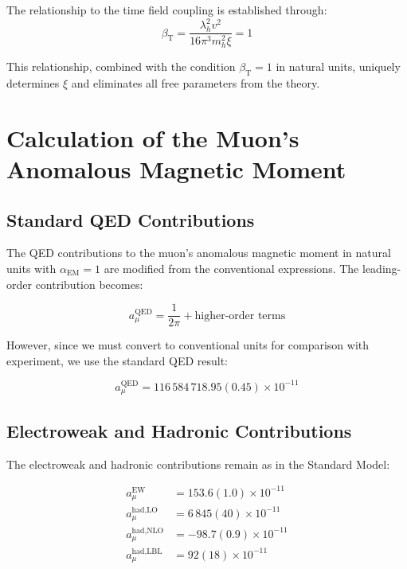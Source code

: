 \documentclass[12pt,a4paper]{article}
\newcommand{\alphaEM}{\alpha_{\text{EM}}}
\newcommand{\betaT}{\beta_{\text{T}}}
\newcommand{\xipar}{\xi}
\begin{document}
	The relationship to the time field coupling is established through:
	\begin{equation}
		\betaT = \frac{\lambda_h^2 v^2}{16\pi^3 m_h^2 \xipar} = 1
		\label{eq:beta_t_relationship}
	\end{equation}
	
	This relationship, combined with the condition $\betaT = 1$ in natural units, uniquely determines $\xipar$ and eliminates all free parameters from the theory.
	
	\section{Calculation of the Muon's Anomalous Magnetic Moment}
	
	\subsection{Standard QED Contributions}
	
	The QED contributions to the muon's anomalous magnetic moment in natural units with $\alphaEM = 1$ are modified from the conventional expressions. The leading-order contribution becomes:
	
	\begin{equation}
		a_\mu^{\text{QED}} = \frac{1}{2\pi} + \text{higher-order terms}
	\end{equation}
	
	However, since we must convert to conventional units for comparison with experiment, we use the standard QED result:
	
	\begin{equation}
		a_\mu^{\text{QED}} = 116\,584\,718.95(0.45) \times 10^{-11}
	\end{equation}
	
	\subsection{Electroweak and Hadronic Contributions}
	
	The electroweak and hadronic contributions remain as in the Standard Model:
	
	\begin{align}
		a_\mu^{\text{EW}} &= 153.6(1.0) \times 10^{-11}\\
		a_\mu^{\text{had,LO}} &= 6\,845(40) \times 10^{-11}\\
		a_\mu^{\text{had,NLO}} &= -98.7(0.9) \times 10^{-11}\\
		a_\mu^{\text{had,LBL}} &= 92(18) \times 10^{-11}
	\end{align}
	
\end{document}

